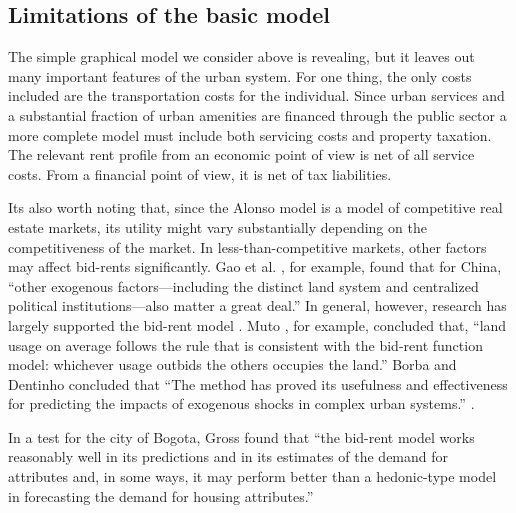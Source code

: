 


 
\subsection{Limitations of the basic model}
The simple graphical model we consider above is revealing, but it leaves out many important features of the urban system. For one thing, the only costs included are the transportation costs for the individual.  Since urban services and  a substantial fraction of urban amenities are financed through the public sector a more complete model must include both servicing costs and property taxation. The relevant rent profile from an economic point of view is net of all service costs. From a financial point of view, it is net of tax liabilities.%

Its also worth noting that, since the Alonso model is  a model of competitive real estate markets, its utility might vary substantially depending on the competitiveness of the market.  In less-than-competitive markets, other factors may affect bid-rents significantly. %
Gao et al. \cite{GaoJinlong2020BtbT}, for example,  found  that for China, ``other exogenous  factors---including the distinct land system  and centralized political institutions---also matter a great deal.'' In general, however, 
research has largely supported the bid-rent model \cite{mutoEstimationBidRent2006, wheatonBidRentApproach1977}. Muto \cite{mutoEstimationBidRent2006}, for example, concluded that, ``land usage on average follows the rule that is consistent with the bid-rent function model: whichever usage outbids the others occupies the land.''  Borba and Dentinho concluded that ``The method has proved its usefulness and effectiveness for predicting the impacts of exogenous shocks in complex urban systems.'' \cite{borbaEvaluationUrbanScenarios2016}.  

In a test for the city of Bogota, Gross \cite{grossEstimatingWillingnessPay1988} found that ``the bid-rent model works reasonably well in its predictions and in its estimates of the demand for attributes and, in some ways, it may perform better than a hedonic-type model in forecasting the demand for housing attributes.'' 

